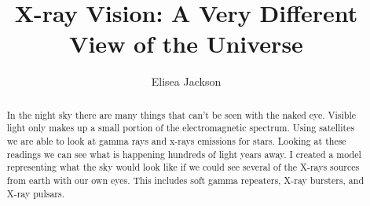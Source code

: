 \documentclass[final,6p,times,twocolumn,authoryear]{elsarticle}
\begin{document}
\begin{frontmatter}



\title {X-ray Vision: A Very Different View of the Universe}


\author[first]{Elisea Jackson}

\begin{abstract}
In the night sky there are many things that can’t be seen with the naked eye. Visible light only makes up a small portion of the electromagnetic spectrum. Using satellites we are able to look at gamma rays and x-rays emissions for stars. Looking at these readings we can see what is happening hundreds of light years away. I created a model representing what the sky would look like if we could see several of the X-rays sources from earth with our own eyes. This includes soft gamma repeaters, X-ray bursters, and X-ray pulsars.

\end{abstract}


\end{frontmatter}
\end{document}
